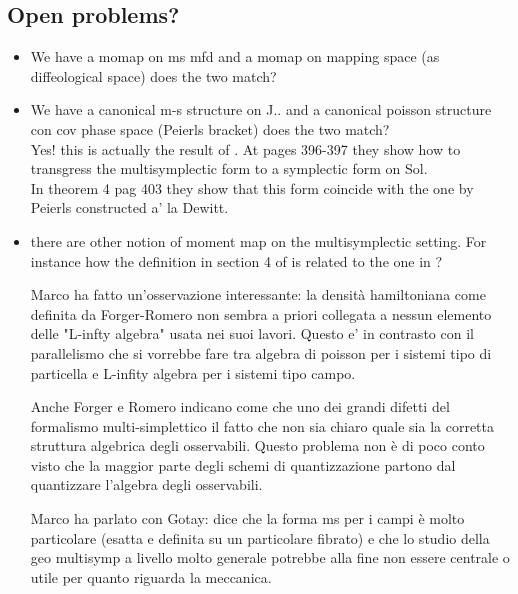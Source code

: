 \subsection{Open problems?}
\begin{itemize}
	\item We have a momap on ms mfd and a momap on mapping space (as diffeological space) does the two match?
	\item We have a canonical m-s structure on J.. and a canonical poisson structure con cov phase space (Peierls bracket) does the two match? \\
		Yes! this is actually the result of \cite{forgeromero}. At pages 396-397 they show how to transgress the multisymplectic form to a symplectic form on Sol.\\
		In theorem 4 pag 403 they show that this form coincide with the one by Peierls constructed a' la Dewitt.

	\item there are other notion of moment map on the multisymplectic setting. For instance how the definition in section 4 of \cite{Gotay1998a} is related to the one in \cite{Ryvkin2018}?

Marco ha fatto un'osservazione interessante: la densità hamiltoniana come definita da Forger-Romero non sembra a priori collegata a nessun elemento delle "L-infty algebra" usata nei suoi lavori. Questo e' in contrasto con il parallelismo che si vorrebbe fare tra algebra di poisson per i sistemi tipo di particella e L-infity algebra per i sistemi tipo campo.

Anche Forger e Romero indicano come che uno dei grandi difetti del formalismo multi-simplettico il fatto che non sia chiaro quale sia la corretta struttura algebrica degli osservabili. Questo problema non è di poco conto visto che la maggior parte degli schemi di quantizzazione partono dal quantizzare l'algebra degli osservabili.

Marco ha parlato con Gotay: dice che la forma ms per i campi è molto particolare (esatta e definita su un particolare fibrato) e che lo studio della geo multisymp a livello molto generale potrebbe alla fine non essere centrale o utile per quanto riguarda la meccanica.	
	

\end{itemize}


			\nocite{*}
			
			





